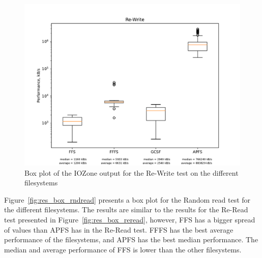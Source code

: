 \begin{figure}[!ht]
	\label{fig:res_box_rewrite}
	\begin{center}
		\includegraphics[width=1.0\textwidth]{figures/benchmarking/Re-Write_box.pdf}
	\end{center}
	\caption{Box plot of the IOZone output for the Re-Write test on the different filesystems}
\end{figure}

\FloatBarrier

Figure~\ref{fig:res_box_rndread} presents a box plot for the Random read test for the different filesystems. The results are similar to the results for the \mbox{Re-Read} test presented in Figure~\ref{fig:res_box_reread}, however, \gls{FFS} has a bigger spread of values than \gls{APFS} has in the \mbox{Re-Read} test. \gls{FFFS} has the best average performance of the filesystems, and \gls{APFS} has the best median performance. The median and average performance of \gls{FFS} is lower than the other filesystems.

